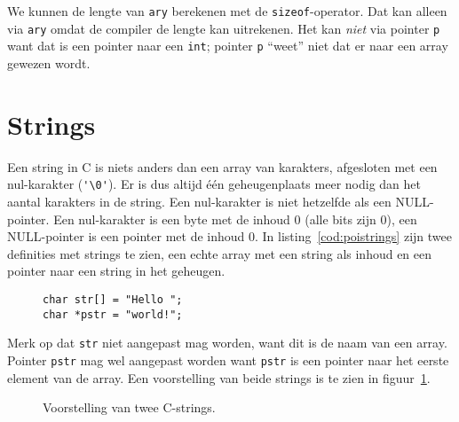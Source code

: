 We kunnen de lengte van \texttt{ary} berekenen met de \texttt{sizeof}-operator. Dat kan alleen via \texttt{ary} omdat de compiler de lengte kan uitrekenen. Het kan \textsl{niet} via pointer \texttt{p} want dat is een pointer naar een \texttt{int}; pointer \texttt{p} ``weet'' niet dat er naar een array gewezen wordt.


\section{Strings}
\label{sec:strings}
Een string in C is niets anders dan een array van karakters, afgesloten met een nul-karakter (\lstinline|'\0'|). Er is dus altijd één geheugenplaats meer nodig dan het aantal karakters in de string. Een nul-karakter is niet hetzelfde als een NULL-pointer. Een nul-karakter is een byte met de inhoud 0 (alle bits zijn 0), een NULL-pointer is een pointer met de inhoud 0. In listing~\ref{cod:poistrings} zijn twee definities met strings te zien, een echte array met een string als inhoud en een pointer naar een string in het geheugen.

\begin{figure}[!ht]
\begin{lstlisting}[caption=Definitie en initialisatie van twee C-strings.,label=cod:poistrings]
char str[] = "Hello ";
char *pstr = "world!";
\end{lstlisting}
\end{figure}

Merk op dat \texttt{str} niet aangepast mag worden, want dit is de naam van een array. Pointer \texttt{pstr} mag wel aangepast worden want \texttt{pstr} is een pointer naar het eerste element van de array. Een voorstelling van beide strings is te zien in figuur~\ref{fig:poistrings}.

\begin{figure}[!ht]
\centering
{}
\caption{Voorstelling van twee C-strings.}
\label{fig:poistrings}
\end{figure}

